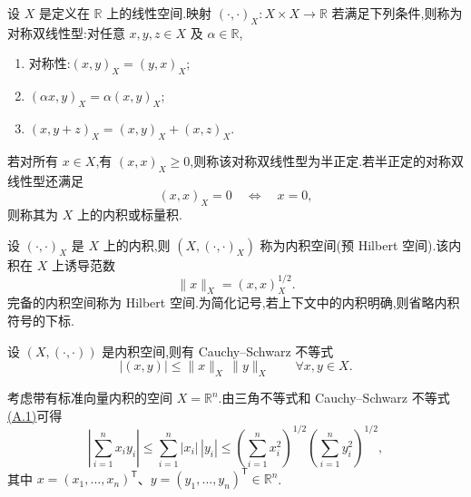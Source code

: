 \begin{definition}[内积与标量积]\label{def:appendix-a-11}
设 $X$ 是定义在 $\mathbb R$ 上的线性空间.映射 $(\cdot,\cdot)_X:X\times X\to\mathbb R$ 若满足下列条件,则称为对称双线性型:对任意 $x,y,z\in X$ 及 $\alpha\in\mathbb R$,
\begin{enumerate}[label=(\roman*)]
  \item 对称性:$(x,y)_X=(y,x)_X$;
  \item $(\alpha x,y)_X=\alpha(x,y)_X$;
  \item $(x,y+z)_X=(x,y)_X+(x,z)_X$.
\end{enumerate}
若对所有 $x\in X$,有 $(x,x)_X\ge0$,则称该对称双线性型为半正定.若半正定的对称双线性型还满足
\[
 (x,x)_X=0\quad\Longleftrightarrow\quad x=0,
\]
则称其为 $X$ 上的内积或标量积.
\end{definition}

\begin{definition}\label{def:appendix-a-12}
设 $(\cdot,\cdot)_X$ 是 $X$ 上的内积,则 $(X,(\cdot,\cdot)_X)$ 称为内积空间(预 Hilbert 空间).该内积在 $X$ 上诱导范数
\[
 \|x\|_X=(x,x)_X^{1/2}.
\]
完备的内积空间称为 Hilbert 空间.为简化记号,若上下文中的内积明确,则省略内积符号的下标.
\end{definition}

\begin{lemma}\label{lem:appendix-a-13}
设 $(X,(\cdot,\cdot))$ 是内积空间,则有 Cauchy--Schwarz 不等式
\begin{equation}\label{eq:appendix-a-1}
 |(x,y)|\le\|x\|_X\,\|y\|_X\qquad\forall x,y\in X.
\end{equation}
\end{lemma}

\begin{example}\label{ex:appendix-a-14}
考虑带有标准向量内积的空间 $X=\mathbb R^n$.由三角不等式和 Cauchy--Schwarz 不等式\hyperref[eq:appendix-a-1]{(A.1)}可得
\begin{equation}\label{eq:appendix-a-2}
 \left|\sum_{i=1}^n x_i y_i\right|
 \le\sum_{i=1}^n|x_i|\,|y_i|
 \le\left(\sum_{i=1}^n x_i^2\right)^{1/2}
      \left(\sum_{i=1}^n y_i^2\right)^{1/2},
\end{equation}
其中 $x=(x_1,\ldots,x_n)^{\mathsf T}$、$y=(y_1,\ldots,y_n)^{\mathsf T}\in\mathbb R^n$.
\end{example}

